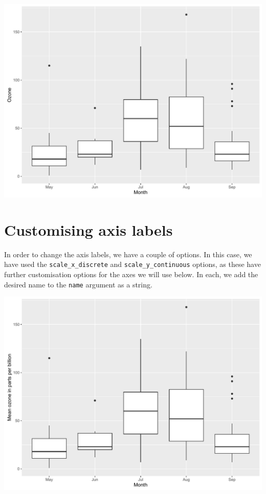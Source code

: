 \begin{Shaded}
\begin{Highlighting}[]
\StringTok{ }\NormalTok{(}  \StringTok{ }
\StringTok{       }\NormalTok{()}
\end{Highlighting}
\end{Shaded}

\begin{center}\includegraphics[width=0.55\linewidth]{figures/box_1-1} \end{center}

\section{Customising axis labels}\label{customising-axis-labels-3}

In order to change the axis labels, we have a couple of options. In this
case, we have used the \texttt{scale\_x\_discrete} and
\texttt{scale\_y\_continuous} options, as these have further
customisation options for the axes we will use below. In each, we add
the desired name to the \texttt{name} argument as a string.

\begin{Shaded}
\begin{Highlighting}[]
\StringTok{ }\StringTok{ }\NormalTok{(} \NormalTok{) +}
\StringTok{       }\NormalTok{(} \NormalTok{)}
\end{Highlighting}
\end{Shaded}

\begin{center}\includegraphics[width=0.55\linewidth]{figures/box_2-1} \end{center}

